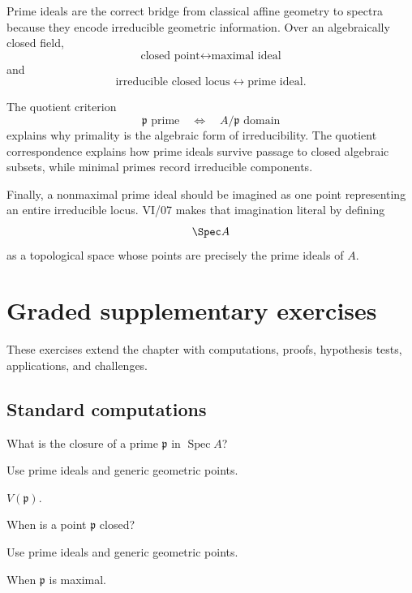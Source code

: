 Prime ideals are the correct bridge from classical affine geometry to spectra because they
encode irreducible geometric information.  Over an algebraically closed field,
\[
\text{closed point}
\longleftrightarrow
\text{maximal ideal}
\]
and
\[
\text{irreducible closed locus}
\longleftrightarrow
\text{prime ideal}.
\]

The quotient criterion
\[
\mathfrak p\text{ prime}
\quad\Longleftrightarrow\quad
A/\mathfrak p\text{ domain}
\]
explains why primality is the algebraic form of irreducibility.  The quotient correspondence
explains how prime ideals survive passage to closed algebraic subsets, while minimal primes
record irreducible components.

Finally, a nonmaximal prime ideal should be imagined as one point representing an entire
irreducible locus.  VI/07 makes that imagination literal by defining
\[
\Spec A
\]
as a topological space whose points are precisely the prime ideals of \(A\).
\section{Graded supplementary exercises}
These exercises extend the chapter with computations, proofs, hypothesis tests, applications, and challenges.

\subsection*{Standard computations}

\begin{exercise}[Closure]\label{exr:vi06-expand-01}
What is the closure of a prime $\mathfrak p$ in $\operatorname{Spec}A$?
\end{exercise}
\begin{hint}
Use prime ideals and generic geometric points.
\end{hint}
\begin{solution}
$V(\mathfrak p)$.
\end{solution}

\begin{exercise}\label{exr:vi06-expand-02}
When is a point $\mathfrak p$ closed?
\end{exercise}
\begin{hint}
Use prime ideals and generic geometric points.
\end{hint}
\begin{solution}
When $\mathfrak p$ is maximal.
\end{solution}

